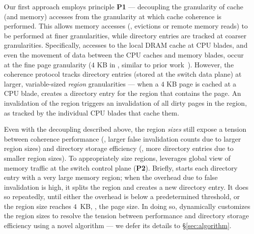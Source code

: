  Our first approach employs principle \textbf{P1} --- decoupling the granularity of cache (and memory) accesses from the granularity at which cache coherence is performed. This allows memory accesses (\eg, evictions or remote memory reads) to be performed at finer granularities, while directory entries are tracked at coarser granularities. Specifically, accesses to the local DRAM cache at CPU blades, and even the movement of data between the CPU caches and memory blades, occur at the fine page granularity ($4$ KB in \mind, similar to prior work~\cite{legoos, infiniswap, fastswap}). However, the coherence protocol tracks directory entries (stored at the switch data plane) at larger, variable-sized \textit{region} granularities --- when a $4$ KB page is cached at a CPU blade, \mind creates a directory entry for the region that contains the page. An invalidation of the region triggers an invalidation of all dirty pages in the region, as tracked by the individual CPU blades that cache them.

 Even with the decoupling described above, the region \textit{sizes} still expose a tension between coherence performance (\eg, larger false invalidation counts due to larger region sizes) and directory storage efficiency (\eg, more directory entries due to smaller region sizes). To appropriately size regions, \mind leverages global view of memory traffic at the switch control plane (\textbf{P2}). Briefly, \mind starts each directory entry with a very large memory region; when the overhead due to false invalidation is high, it splits the region and creates a new directory entry. It does so repeatedly, until either the overhead is below a predetermined threshold, or the region size reaches $4$~KB, \ie, the page size. In doing so, \mind dynamically customizes the region sizes to resolve the tension between performance and directory storage efficiency using a novel \sizing algorithm --- we defer its details to \S\ref{sec:algorithm}.

